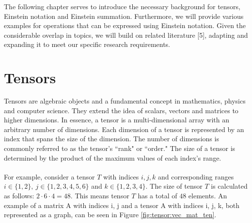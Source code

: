 The following chapter serves to introduce the necessary background for tensors,
Einstein notation and Einstein summation. Furthermore, we will provide various
examples for operations that can be expressed using Einstein notation. Given the
considerable overlap in topics, we will build on related literature [5], adapting
and expanding it to meet our specific research requirements.

\section{Tensors}
Tensors are algebraic objects and a fundamental concept in mathematics, physics
and computer science. They extend the idea of scalars, vectors and matrices to
higher dimensions. In essence, a tensor is a multi-dimensional array with an arbitrary
number of dimensions. Each dimension of a tensor is represented by an index that spans
the size of the dimension. The number of dimensions is commonly referred to as the
tensor's ``rank" or ``order." The size of a tensor is determined by the product
of the maximum values of each index's range.
\\
\\
For example, consider a tensor $T$ with indices $i,j,k$ and corresponding ranges
$i \in \{1,2\},\ j \in \{1,2,3,4,5,6\}$ and $k \in \{1,2,3,4\}$. The size of
tensor $T$ is calculated as follows: $2 \cdot 6 \cdot 4 = 48$. This means tensor
$T$ has a total of $48$ elements. An example of a matrix A with indices i, j and a tensor
A with indices i, j, k, both represented as a graph, can be seen in Figure
\ref{fig:tensor:vec_mat_ten}.

